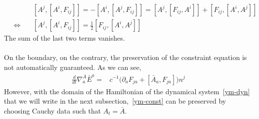 \begin{equation}
\begin{split}
&[A^j, [A^i, F_{ij}]] = - [A^i, [A^j, F_{ij}]]
= [A^j, [F_{ij}, A^i]] + [F_{ij}, [A^i, A^j]] \\
 \quad\Leftrightarrow\quad &
[A^j, [A^i, F_{ij}]] = \frac 1 2 [F_{ij}, [A^i, A^j]]
\end{split}
\end{equation}
The sum of the last two terms vanishes. \\\\
On the boundary, on the contrary, the preservation of the constraint equation is not automatically guaranteed. As we can see,
\begin{equation*}
\begin{split}
\frac{d}{dt}\nabla^{\bar A}_a \bar{E}^a = & 
 c^{-1}\big(\partial_a F_{ja}+ [\bar{A}_a, F_{ja}]\big) n^j
\end{split}
\end{equation*}
However, with the domain of the Hamiltonian of the dynamical system~\cref{ym-dyn} that we will write in the next subsection,~\cref{ym-const} can be preserved by choosing Cauchy data such that $A_t = \bar A$.



















